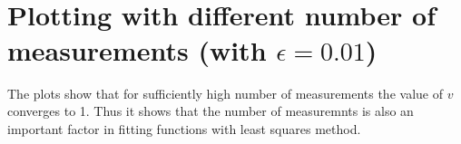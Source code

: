 \documentclass[11pt]{article}
\begin{document}
    \begin{center}
    \end{center}
    { \hspace*{\fill} \\}
    
    \begin{center}
    \end{center}
    { \hspace*{\fill} \\}
    
    \begin{center}
    \end{center}
    { \hspace*{\fill} \\}
    
    \begin{center}
    \end{center}
    { \hspace*{\fill} \\}
    
    \hypertarget{plotting-with-different-number-of-measurements-with-epsilon0.01}{%
\section{\texorpdfstring{Plotting with different number of measurements
(with
\(\epsilon=0.01\))}{Plotting with different number of measurements (with \textbackslash{}epsilon=0.01)}}\label{plotting-with-different-number-of-measurements-with-epsilon0.01}}

The plots show that for sufficiently high number of measurements the
value of \(v\) converges to 1. Thus it shows that the number of
measuremnts is also an important factor in fitting functions with least
squares method.
\end{document}
